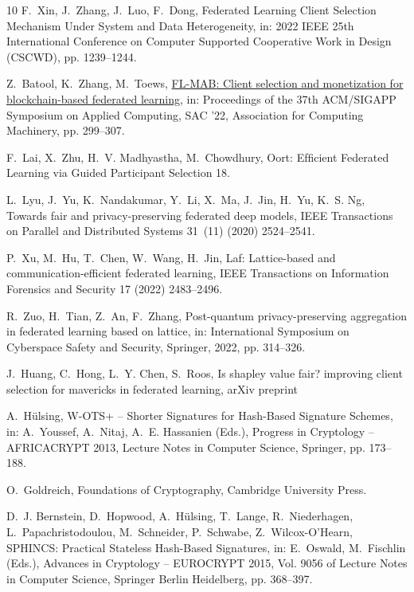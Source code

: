 \documentclass[5p,times]{elsarticle}
\theoremstyle{definition}
\theoremstyle{remark}
\numberwithin{equation}{section}
\begin{document}
\begin{thebibliography}{10}
F.~Xin, J.~Zhang, J.~Luo, F.~Dong, Federated {{Learning Client Selection
  Mechanism Under System}} and {{Data Heterogeneity}}, in: 2022 {{IEEE}} 25th
  {{International Conference}} on {{Computer Supported Cooperative Work}} in
  {{Design}} ({{CSCWD}}), pp. 1239--1244.


Z.~Batool, K.~Zhang, M.~Toews,
  \href{http://doi.org/10.1145/3477314.3507050}{{{FL-MAB}}: Client selection
  and monetization for blockchain-based federated learning}, in: Proceedings of
  the 37th {{ACM}}/{{SIGAPP Symposium}} on {{Applied Computing}}, {{SAC}} '22,
  {Association for Computing Machinery}, pp. 299--307.


F.~Lai, X.~Zhu, H.~V. Madhyastha, M.~Chowdhury, Oort: {{Efﬁcient Federated
  Learning}} via {{Guided Participant Selection}}  18.

L.~Lyu, J.~Yu, K.~Nandakumar, Y.~Li, X.~Ma, J.~Jin, H.~Yu, K.~S. Ng, Towards
  fair and privacy-preserving federated deep models, IEEE Transactions on
  Parallel and Distributed Systems 31~(11) (2020) 2524--2541.

P.~Xu, M.~Hu, T.~Chen, W.~Wang, H.~Jin, Laf: Lattice-based and
  communication-efficient federated learning, IEEE Transactions on Information
  Forensics and Security 17 (2022) 2483--2496.


R.~Zuo, H.~Tian, Z.~An, F.~Zhang, Post-quantum privacy-preserving aggregation
  in federated learning based on lattice, in: International Symposium on
  Cyberspace Safety and Security, Springer, 2022, pp. 314--326.

J.~Huang, C.~Hong, L.~Y. Chen, S.~Roos, Is shapley value fair? improving client
  selection for mavericks in federated learning, arXiv preprint


A.~Hülsing, W-{{OTS}}+ – {{Shorter Signatures}} for {{Hash-Based Signature
  Schemes}}, in: A.~Youssef, A.~Nitaj, A.~E. Hassanien (Eds.), Progress in
  {{Cryptology}} – {{AFRICACRYPT}} 2013, Lecture {{Notes}} in {{Computer
  Science}}, {Springer}, pp. 173--188.


O.~Goldreich, Foundations of Cryptography, {Cambridge University Press}.

D.~J. Bernstein, D.~Hopwood, A.~Hülsing, T.~Lange, R.~Niederhagen,
  L.~Papachristodoulou, M.~Schneider, P.~Schwabe, Z.~Wilcox-O’Hearn,
  {{SPHINCS}}: {{Practical Stateless Hash-Based Signatures}}, in: E.~Oswald,
  M.~Fischlin (Eds.), Advances in {{Cryptology}} -- {{EUROCRYPT}} 2015, Vol.
  9056 of Lecture {{Notes}} in {{Computer Science}}, {Springer Berlin
  Heidelberg}, pp. 368--397.



\end{thebibliography}
\end{document}
